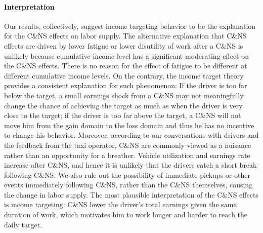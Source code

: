 \documentclass[reviewmode]{restat}
\begin{document}
\paragraph{Interpretation} Our results, collectively, suggest income targeting behavior to be the explanation
for the C\&NS effects on labor supply. The alternative explanation that C\&NS effects are driven by lower
fatigue or lower disutility of work after a C\&NS is unlikely because cumulative income level has a significant 
moderating effect on the C\&NS effects. There is no reason for the effect of fatigue to be different at 
different cumulative income levels. On the contrary, the income target theory provides a consistent explanation
for such phenomenon: If the driver is too far below the target, a small earnings shock from a C\&NS may not
meaningfully change the chance of achieving the target as much as when the driver is very close to the target; 
if the driver is too far above the target, a C\&NS will not move him from the gain domain to the loss domain
and thus he has no incentive to change his behavior. Moreover, according to our conversations with drivers 
and the feedback from the taxi operator, C\&NS are commonly viewed as a nuisance rather than an opportunity
for a breather. Vehicle utilization and earnings rate increase after C\&NS, and hence it is unlikely that
the drivers catch a short break following C\&NS. We also rule out the possibility of immediate pickups or
other events immediately following C\&NS, rather than the C\&NS themselves, causing the change in labor 
supply. The most plausible interpretation of the C\&NS effects is income targeting: C\&NS lower the 
driver's total earnings given the same duration of work, which motivates him to work longer and harder
to reach the daily target. 
\end{document}
